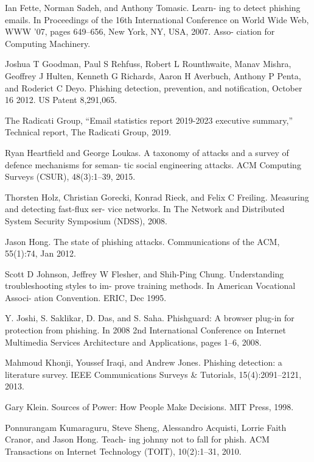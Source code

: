\documentclass[lettersize,journal]{IEEEtran}
\begin{document}
\begin{thebibliography}{1}
  Ian Fette, Norman Sadeh, and Anthony Tomasic. Learn-
  ing to detect phishing emails. In Proceedings of the 16th
  International Conference on World Wide Web, WWW
  ’07, pages 649–656, New York, NY, USA, 2007. Asso-
  ciation for Computing Machinery.

  Joshua T Goodman, Paul S Rehfuss, Robert L Rounthwaite, Manav Mishra, Geoffrey J Hulten, Kenneth G Richards, Aaron H Averbuch, Anthony P Penta, and Roderict C Deyo. Phishing detection, prevention, and notification, October 16 2012. US Patent 8,291,065.

  The Radicati Group, ``Email statistics report 2019-2023 executive summary,'' Technical report, The Radicati Group, 2019.

  Ryan Heartfield and George Loukas. A taxonomy of
  attacks and a survey of defence mechanisms for seman-
  tic social engineering attacks. ACM Computing Surveys
  (CSUR), 48(3):1–39, 2015.

  Thorsten Holz, Christian Gorecki, Konrad Rieck, and
  Felix C Freiling. Measuring and detecting fast-flux ser-
  vice networks. In The Network and Distributed System
  Security Symposium (NDSS), 2008.

  Jason Hong. The state of phishing attacks. Communications of the ACM, 55(1):74, Jan 2012.

  Scott D Johnson, Jeffrey W Flesher, and Shih-Ping
  Chung. Understanding troubleshooting styles to im-
  prove training methods. In American Vocational Associ-
  ation Convention. ERIC, Dec 1995.

  Y. Joshi, S. Saklikar, D. Das, and S. Saha. Phishguard:
  A browser plug-in for protection from phishing. In
  2008 2nd International Conference on Internet Multimedia Services Architecture and Applications, pages 1–6,
  2008.

  Mahmoud Khonji, Youssef Iraqi, and Andrew Jones.
  Phishing detection: a literature survey. IEEE Communications Surveys & Tutorials, 15(4):2091–2121, 2013.

  Gary Klein. Sources of Power: How People Make Decisions. MIT Press, 1998.

  Ponnurangam Kumaraguru, Steve Sheng, Alessandro
  Acquisti, Lorrie Faith Cranor, and Jason Hong. Teach-
  ing johnny not to fall for phish. ACM Transactions on
  Internet Technology (TOIT), 10(2):1–31, 2010.


\end{thebibliography}
\end{document}

